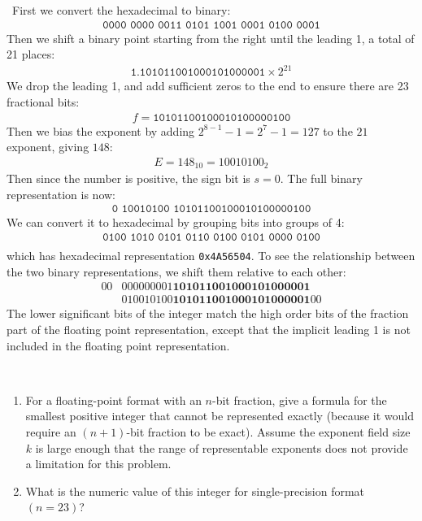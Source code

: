 \documentclass[12pt]{article}
\newenvironment{ex}[2][Exercise]{\begin{trivlist}
		\item[\hskip \labelsep {\bfseries #1}\hskip \labelsep {\bfseries #2.}]}{\end{trivlist}}
\newenvironment{sol}[1][Solution]{\begin{trivlist}
		\item[\hskip \labelsep {\bfseries #1:}]}{\end{trivlist}}
\begin{document}
\begin{sol}
	\
	First we convert the hexadecimal to binary:
	\begin{align*}
		\texttt{0000 0000 0011 0101 1001 0001 0100 0001}
	\end{align*}
	Then we shift a binary point starting from the right until the leading 1,
	a total of 21 places:
	\begin{align*}
		\texttt{1.101011001000101000001}\times 2^{21}
	\end{align*}
	We drop the leading 1, and add sufficient zeros to the end to ensure there are 23
	fractional bits:
	\begin{align*}
		f=\texttt{10101100100010100000100}
	\end{align*}
	Then we bias the exponent by adding $2^{8-1}-1=2^7-1=127$ to the $21$ exponent,
	giving $148$:
	\begin{align*}
		E=148_{10}=10010100_2
	\end{align*}
	Then since the number is positive, the sign bit is $s=0$. The full binary representation
	is now:
	\begin{align*}
		\texttt{0 10010100 10101100100010100000100}
	\end{align*}
	We can convert it to hexadecimal by grouping bits into groups of 4:
	\begin{align*}
		\texttt{0100 1010 0101 0110 0100 0101 0000 0100}\\
	\end{align*}
	which has hexadecimal representation \texttt{0x4A56504}. To see the relationship
	between the two binary representations, we shift them relative to each other:
	\begin{align*}
		00&000000001\textbf{101011001000101000001}\\
		  &010010100\textbf{101011001000101000001}00
	\end{align*}
	The lower significant bits of the integer match the high order bits of the fraction
	part of the floating point representation, except that the implicit leading 1 is not
	included in the floating point representation.
\end{sol}

\begin{ex}{2.49}
	\
	\begin{enumerate}[label=(\alph*)]
		\item For a floating-point format with an $n$-bit fraction, give a formula
		for the smallest positive integer that cannot be represented exactly (because
		it would require an $(n+1)$-bit fraction to be exact). Assume the exponent
		field size $k$ is large enough that the range of representable exponents does
		not provide a limitation for this problem.
		\item What is the numeric value of this integer for single-precision format
		$(n=23)$?
	\end{enumerate}
\end{ex}
\end{document}

